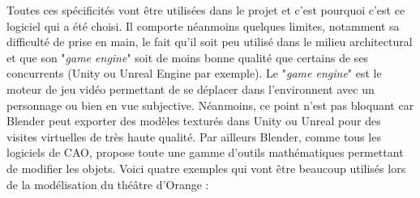 Toutes ces spécificités vont être utilisées dans le projet et c'est pourquoi c'est ce logiciel qui a été choisi. Il comporte néanmoins quelques limites, notamment sa difficulté de prise en main, le fait qu'il soit peu utilisé dans le milieu architectural et que son "\textit{game engine}" soit de moins bonne qualité que certains de ses concurrents (Unity ou Unreal Engine par exemple). Le "\textit{game engine}" est le moteur de jeu vidéo permettant de se déplacer dans l'environnent avec un personnage ou bien en vue subjective. Néanmoins, ce point n'est pas bloquant car Blender peut exporter des modèles texturés dans Unity ou Unreal pour des visites virtuelles de très haute qualité. Par ailleurs Blender, comme tous les logiciels de CAO, propose toute une gamme d'outils mathématiques permettant de modifier les objets. Voici quatre exemples qui vont être beaucoup utilisés lors de la modélisation du théâtre d'Orange :

